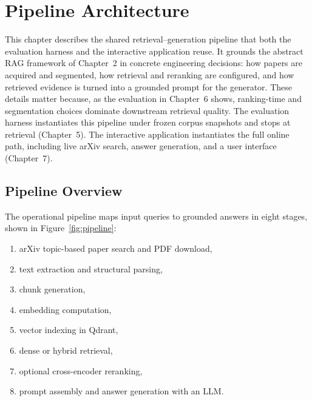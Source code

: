 \documentclass[12pt,a4paper,titlepage,oneside]{book}
\begin{document}
\chapter{Pipeline Architecture}

This chapter describes the shared retrieval--generation pipeline that both the evaluation harness and the interactive application reuse. It grounds the abstract RAG framework of Chapter~2 in concrete engineering decisions: how papers are acquired and segmented, how retrieval and reranking are configured, and how retrieved evidence is turned into a grounded prompt for the generator. These details matter because, as the evaluation in Chapter~6 shows, ranking-time and segmentation choices dominate downstream retrieval quality. The evaluation harness instantiates this pipeline under frozen corpus snapshots and stops at retrieval (Chapter~5). The interactive application instantiates the full online path, including live arXiv search, answer generation, and a user interface (Chapter~7).

\section{Pipeline Overview}
The operational pipeline maps input queries to grounded answers in eight stages, shown in Figure~\ref{fig:pipeline}:
\begin{enumerate}
    \item arXiv topic-based paper search and PDF download,
    \item text extraction and structural parsing,
    \item chunk generation,
    \item embedding computation,
    \item vector indexing in Qdrant,
    \item dense or hybrid retrieval,
    \item optional cross-encoder reranking,
    \item prompt assembly and answer generation with an LLM.
\end{enumerate}
\end{document}
